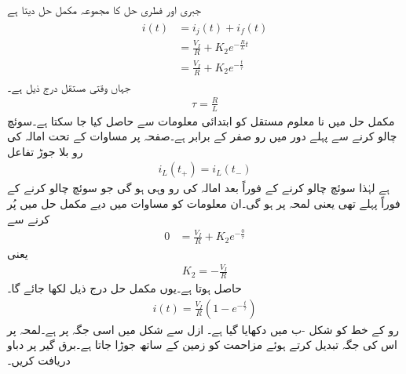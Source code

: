 جبری اور فطری حل کا مجموعہ مکمل حل دیتا ہے
\begin{gather}
\begin{aligned}\label{مساوات_عارضی_مزاحمت_امالہ_مکمل_حل_الف}
i(t)&=i_j(t)+i_f(t)\\
&=\frac{V_I}{R}+K_2e^{-\frac{R}{L}t}\\
&=\frac{V_I}{R}+K_2e^{-\frac{t}{\tau}}
\end{aligned}
\end{gather}
جہاں وقتی مستقل درج ذیل ہے۔
\begin{align}
\tau=\frac{R}{L}
\end{align}
مکمل حل میں نا معلوم مستقل  کو ابتدائی معلومات سے حاصل کیا جا سکتا ہے۔سوئچ چالو کرنے سے پہلے دور میں رو صفر کے برابر ہے۔صفحہ  پر مساوات  کے تحت امالہ کی رو بلا جوڑ تفاعل
\begin{align*}
i_L(t_+)=i_L(t_-)
\end{align*} 
ہے لہٰذا سوئچ چالو کرنے کے فوراً بعد امالہ کی رو وہی ہو گی جو سوئچ چالو کرنے کے فوراً پہلے تھی یعنی لمحہ  پر  ہو گی۔ان معلومات کو مساوات  میں دیے مکمل حل میں پُر کرنے سے
\begin{align*}
0&=\frac{V_I}{R}+K_2e^{-\frac{0}{\tau}}
\end{align*}
یعنی
\begin{align*}
K_2=-\frac{V_I}{R}
\end{align*}
حاصل ہوتا ہے۔یوں مکمل حل درج ذیل لکھا جائے گا۔
\begin{align}
i(t)=\frac{V_I}{R} \left(1-e^{-\frac{t}{\tau}}\right)
\end{align}
رو کے خط کو شکل -ب میں دکھایا گیا ہے۔
ازل سے شکل  میں  اسی جگہ پر ہے۔لمحہ  پر اس کی جگہ تبدیل کرتے ہوئے  مزاحمت کو زمین کے ساتھ جوڑا جاتا ہے۔برق گیر پر دباو دریافت کریں۔
